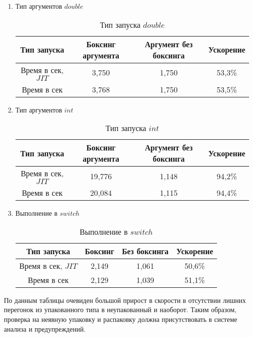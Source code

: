 \documentclass{mipt-thesis-bs}
\begin{document}
\begin{enumerate}
    \item Тип аргументов $double$
\begin{table}[h]
    \centering
    \begin{tabular}{|c|c|c|c|}
      \hline
      Тип запуска & Боксинг аргумента & Аргумент без боксинга & Ускорение \\
      \hline
      Время в сек, $JIT$ & 3,750 & 1,750 & 53,3\% \\
      \hline
      Время в сек & 3,768 & 1,750 & 53,5\% \\
      \hline
    \end{tabular}
    \caption{Тип запуска $double$}
  \end{table}

  \item Тип аргументов $int$

\begin{table}[h]
    \centering
    \begin{tabular}{|c|c|c|c|}
      \hline
      Тип запуска & Боксинг аргумента & Аргумент без боксинга & Ускорение \\
      \hline
      Время в сек, $JIT$ & 19,776 & 1,148 & 94,2\% \\
      \hline
      Время в сек & 20,084 & 1,115 & 94,4\% \\
      \hline
    \end{tabular}
    \caption{Тип запуска $int$}
  \end{table}

  \item Выполнение в $switch$
  \begin{table}[h]
    \centering
    \begin{tabular}{|c|c|c|c|}
      \hline
      Тип запуска & Боксинг & Без боксинга & Ускорение \\
      \hline
      Время в сек, $JIT$ & 2,149 & 1,061 & 50,6\% \\
      \hline
      Время в сек & 2,129 & 1,039 & 51,1\% \\
      \hline
    \end{tabular}
    \caption{Выполнение в $switch$}
  \end{table}
\end{enumerate}

По данным таблицы очевиден большой прирост в скорости в отсутствии
лишних перегонок из упакованного типа в неупакованный и наоборот.
Таким образом, проверка на неявную упаковку и распаковку должна
присутствовать в системе анализа и предупреждений.
\end{document}
